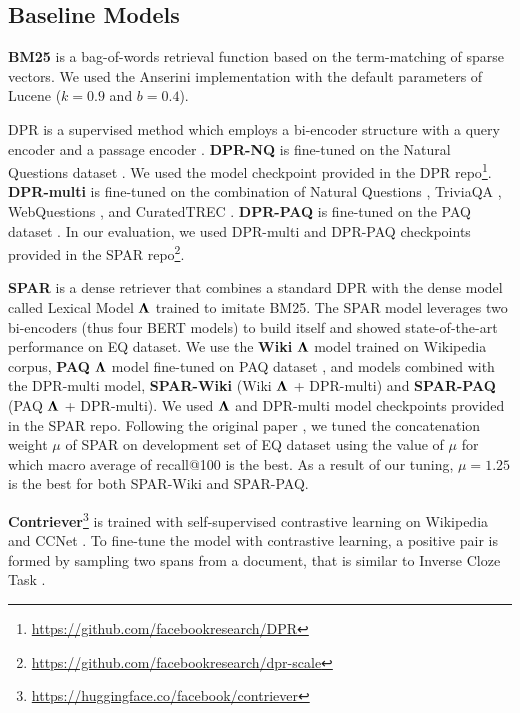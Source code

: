 \documentclass[letterpaper]{article} \usepackage{aaai23}  \usepackage{times}  \usepackage{helvet}  \usepackage{courier}  \usepackage[hyphens]{url}  \usepackage{graphicx} \urlstyle{rm} \def\UrlFont{\rm}  \usepackage{natbib}  \usepackage{caption} \frenchspacing  \setlength{\pdfpagewidth}{8.5in}  \setlength{\pdfpageheight}{11in}  \usepackage{algorithm}
\begin{document}
\subsection{Baseline Models}
\textbf{BM25} \citep{robertson2009probabilistic} is a bag-of-words retrieval function based on the term-matching of sparse vectors.
We used the Anserini \citep{anserini_Yang0L17} implementation with the default parameters of Lucene ($k = 0.9$ and $b = 0.4$).

DPR is a supervised method which employs a bi-encoder structure with a query encoder and a passage encoder \citep{karpukhin-etal-2020-dense}.
\textbf{DPR-NQ} is fine-tuned on the Natural Questions dataset \citep{kwiatkowski-etal-2019-natural}.
We used the model checkpoint provided in the DPR repo\footnote{\url{https://github.com/facebookresearch/DPR}}.
\textbf{DPR-multi} is fine-tuned on the combination of Natural Questions \citep{kwiatkowski-etal-2019-natural}, TriviaQA \citep{joshi-etal-2017-triviaqa}, WebQuestions \citep{berant-etal-2013-semantic}, and CuratedTREC \citep{curatedtrec}.
\textbf{DPR-PAQ} is fine-tuned on the PAQ dataset \citep{lewis-etal-2021-paq}.
In our evaluation, we used DPR-multi and DPR-PAQ checkpoints provided in the SPAR repo\footnote{\url{https://github.com/facebookresearch/dpr-scale}}.

\textbf{SPAR} \citep{Chen2021SalientPA} is a dense retriever that combines a standard DPR with the dense model called Lexical Model $\bf{\Lambda}$ trained to imitate BM25.
The SPAR model leverages two bi-encoders (thus four BERT models) to build itself and showed state-of-the-art performance on EQ dataset.
We use the \textbf{Wiki} $\bf{\Lambda}$ model trained on Wikipedia corpus, \textbf{PAQ} $\bf{\Lambda}$ model fine-tuned on PAQ dataset \citep{lewis-etal-2021-paq}, and models combined with the DPR-multi model, \textbf{SPAR-Wiki} (Wiki $\bf{\Lambda}$ + DPR-multi) and \textbf{SPAR-PAQ} (PAQ $\bf{\Lambda}$ + DPR-multi).
We used $\bf{\Lambda}$ and DPR-multi model checkpoints provided in the SPAR repo.
Following the original paper \citep{Chen2021SalientPA}, we tuned the concatenation weight $\mu$ of SPAR on development set of EQ dataset using the value of $\mu$ for which macro average of recall@100 is the best.
As a result of our tuning, $\mu = 1.25$ is the best for both SPAR-Wiki and SPAR-PAQ.

\textbf{Contriever}\footnote{\url{https://huggingface.co/facebook/contriever}} \citep{contriever} is trained with self-supervised contrastive learning on Wikipedia and CCNet \citep{wenzek-etal-2020-ccnet}.
To fine-tune the model with contrastive learning, a positive pair is formed by sampling two spans from a document, that is similar to Inverse Cloze Task \citep{lee-etal-2019-latent}.
\end{document}
